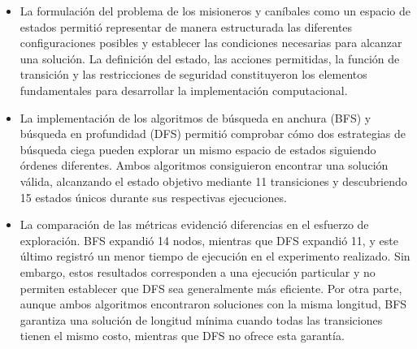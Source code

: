 \documentclass[
  spanish,
]{llncs}
\begin{document}
\begin{itemize}
\item
  La formulación del problema de los misioneros y caníbales como un
  espacio de estados permitió representar de manera estructurada las
  diferentes configuraciones posibles y establecer las condiciones
  necesarias para alcanzar una solución. La definición del estado, las
  acciones permitidas, la función de transición y las restricciones de
  seguridad constituyeron los elementos fundamentales para desarrollar
  la implementación computacional.
\item
  La implementación de los algoritmos de búsqueda en anchura (BFS) y
  búsqueda en profundidad (DFS) permitió comprobar cómo dos estrategias
  de búsqueda ciega pueden explorar un mismo espacio de estados
  siguiendo órdenes diferentes. Ambos algoritmos consiguieron encontrar
  una solución válida, alcanzando el estado objetivo mediante 11
  transiciones y descubriendo 15 estados únicos durante sus respectivas
  ejecuciones.
\item
  La comparación de las métricas evidenció diferencias en el esfuerzo de
  exploración. BFS expandió 14 nodos, mientras que DFS expandió 11, y
  este último registró un menor tiempo de ejecución en el experimento
  realizado. Sin embargo, estos resultados corresponden a una ejecución
  particular y no permiten establecer que DFS sea generalmente más
  eficiente. Por otra parte, aunque ambos algoritmos encontraron
  soluciones con la misma longitud, BFS garantiza una solución de
  longitud mínima cuando todas las transiciones tienen el mismo costo,
  mientras que DFS no ofrece esta garantía.
\end{itemize}
\end{document}
